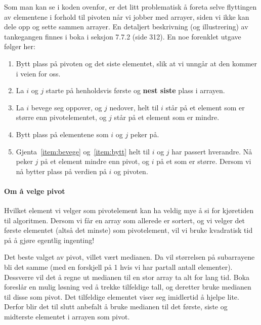 Som man kan se i koden ovenfor, er det litt problematisk å foreta selve
flyttingen av elementene i forhold til pivoten når vi jobber med arrayer, siden
vi ikke kan dele opp og sette sammen arrayer. En detaljert beskrivning (og
illustrering) av tankegangen finnes i boka i seksjon 7.7.2 (side 312). 
En noe forenklet utgave følger her:
\begin{enumerate}
\item Bytt plass på pivoten og det siste elementet, slik at vi unngår at den
  kommer i veien for oss.
\item La $i$ og $j$ starte på henholdsvis første og \textbf{nest siste} plass i
  arrayen. 
\item\label{item:bevege} La $i$ bevege seg oppover, og $j$ nedover, helt til $i$ står på et
  element som er større enn pivotelementet, og $j$ står på et element som er
  mindre.
\item\label{item:bytt} Bytt plass på elementene som $i$ og $j$ peker på.
\item Gjenta~\ref{item:bevege} og~\ref{item:bytt} helt til $i$ og $j$ har
  passert hverandre. Nå peker $j$ på et element mindre enn pivot, og $i$ på et
  som er større. Dersom vi nå bytter plass på verdien på $i$ og pivoten.
\end{enumerate}

\paragraph{Om å velge pivot}
Hvilket element vi velger som pivotelement kan ha veldig mye å si for kjøretiden
til algoritmen. Dersom vi får en array som allerede er sortert, og vi velger det
første elementet (altså det minste) som pivotelement, vil vi bruke kvadratisk
tid på å gjøre egentlig ingenting!

Det beste valget av pivot, villet vært medianen. Da vil størrelsen på
subarrayene bli det samme (med en forskjell på 1 hvis vi har partall antall
elementer). Dessverre vil det å regne ut medianen til en stor array ta alt for
lang tid. Boka foreslår en mulig løsning ved å trekke tilfeldige tall, og
deretter bruke medianen til disse som pivot. Det tilfeldige elementet viser seg
imidlertid å hjelpe lite. Derfor blir det til slutt anbefalt å bruke medianen
til det første, siste og midterste elementet i arrayen som pivot.



